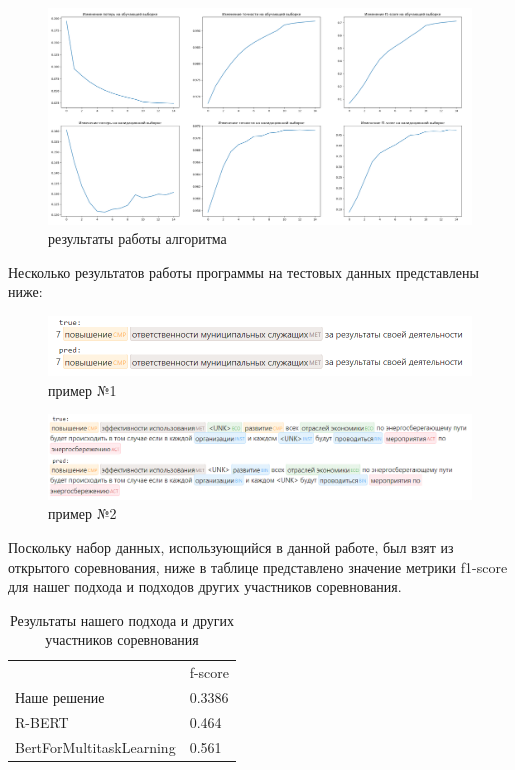 \documentclass{article}
\begin{document}
\begin{figure}[!tbh]
    \centering
    \includegraphics[width=0.9\linewidth]{res.png}
    \caption{результаты работы алгоритма}
    \label{fig:circle}
\end{figure}

Несколько результатов работы программы на тестовых данных представлены ниже: 
\begin{figure}[!tbh]
    \centering
    \includegraphics[width=0.9\linewidth]{exm1.png}
    \caption{пример №1}
    \label{fig:circle}
\end{figure}

\begin{figure}[!tbh]
    \centering
    \includegraphics[width=0.9\linewidth]{exm2.png}
    \caption{пример №2}
    \label{fig:circle}
\end{figure}
 Поскольку набор данных, использующийся в данной работе, был взят из открытого соревнования, ниже в таблице представлено значение метрики f1-score для нашег подхода и подходов других участников соревнования.
\begin{table}[tbh!]
    \centering
    \begin{tabular}[t]{l|l}
         &  f-score\\
        Наше решение & 0.3386\\
        R-BERT & 0.464 \\
        BertForMultitaskLearning & 0.561 \\
    \end{tabular}
    \caption{Результаты нашего подхода и других участников соревнования}
\end{table}
\end{document}
